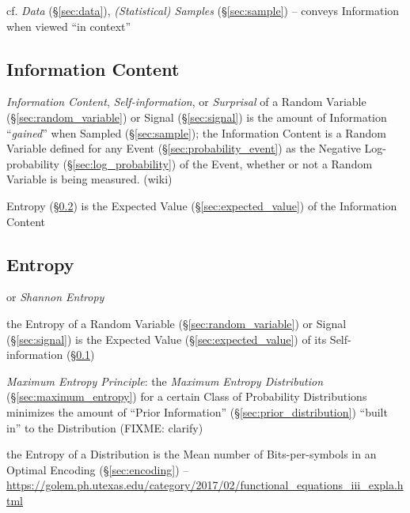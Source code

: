 \fist cf. \emph{Data} (\S\ref{sec:data}), \emph{(Statistical) Samples}
(\S\ref{sec:sample}) -- conveys Information when viewed ``in context''



\subsection{Information Content}\label{sec:information_content}

\emph{Information Content}, \emph{Self-information}, or \emph{Surprisal} of a
Random Variable (\S\ref{sec:random_variable}) or Signal (\S\ref{sec:signal}) is
the amount of Information ``\emph{gained}'' when Sampled (\S\ref{sec:sample});
the Information Content is a Random Variable defined for any Event
(\S\ref{sec:probability_event}) as the Negative Log-probability
(\S\ref{sec:log_probability}) of the Event, whether or not a Random Variable is
being measured. (wiki)

Entropy (\S\ref{sec:entropy}) is the Expected Value
(\S\ref{sec:expected_value}) of the Information Content



\subsection{Entropy}\label{sec:entropy}

or \emph{Shannon Entropy}

the Entropy of a Random Variable (\S\ref{sec:random_variable}) or Signal
(\S\ref{sec:signal}) is the Expected Value (\S\ref{sec:expected_value}) of its
Self-information (\S\ref{sec:information_content})

\emph{Maximum Entropy Principle}: the \emph{Maximum Entropy Distribution}
(\S\ref{sec:maximum_entropy}) for a certain Class of Probability Distributions
minimizes the amount of ``Prior Information'' (\S\ref{sec:prior_distribution})
``built in'' to the Distribution
(FIXME: clarify)

the Entropy of a Distribution is the Mean number of Bits-per-symbols in an
Optimal Encoding (\S\ref{sec:encoding}) --
\url{https://golem.ph.utexas.edu/category/2017/02/functional_equations_iii_expla.html}

